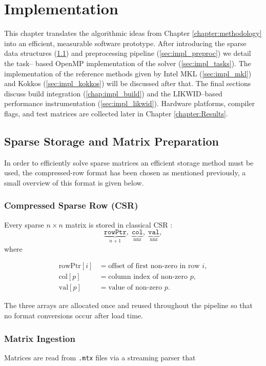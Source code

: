 \chapter{Implementation}
\label{chap:implementation}

This chapter translates the algorithmic ideas from
Chapter \ref{chapter:methodology} into an efficient,
measurable software prototype.  After introducing
the sparse data structures (\ref{sec:impl_csr}) and preprocessing
pipeline (\ref{sec:impl_preproc}) we detail the task–
based OpenMP implementation of the solver (\ref{sec:impl_tasks}). The implementation of the reference methods given by Intel MKL (\ref{sec:impl_mkl}) and Kokkos (\ref{sec:impl_kokkos}) will be discussed after that. The final
sections discuss build integration (\ref{chap:impl_build}) and the LIKWID--based performance instrumentation
(\ref{sec:impl_likwid}). Hardware platforms, compiler flags, and test matrices are collected
later in Chapter \ref{chapter:Results}.

\section{Sparse Storage and Matrix Preparation}
\label{sec:impl_csr}
In order to efficiently solve sparse matrices an efficient storage method must be used, the compressed-row format has been chosen as mentioned previously, a small overview of this format is given below.
\subsection{Compressed Sparse Row (CSR)}
Every sparse $n\times n$ matrix is stored in classical CSR \cite{doi:10.1137/1.9780898718003}:
$$
  \underbrace{\texttt{rowPtr}}_{n+1}
  ,\;
  \underbrace{\texttt{col}}_{\text{nnz}}
  ,\;
  \underbrace{\texttt{val}}_{\text{nnz}},
$$
where  

\begin{align}
  \text{rowPtr}[i]   &= \text{offset of first non-zero in row }i,\\
  \text{col}[p]      &= \text{column index of non-zero }p,\\
  \text{val}[p]      &= \text{value     of non-zero }p .
\end{align}

The three arrays are allocated once and reused throughout the
pipeline so that no format conversions occur after load time.

\subsection{Matrix Ingestion}
Matrices are read from \texttt{.mtx} files via a
streaming parser that

